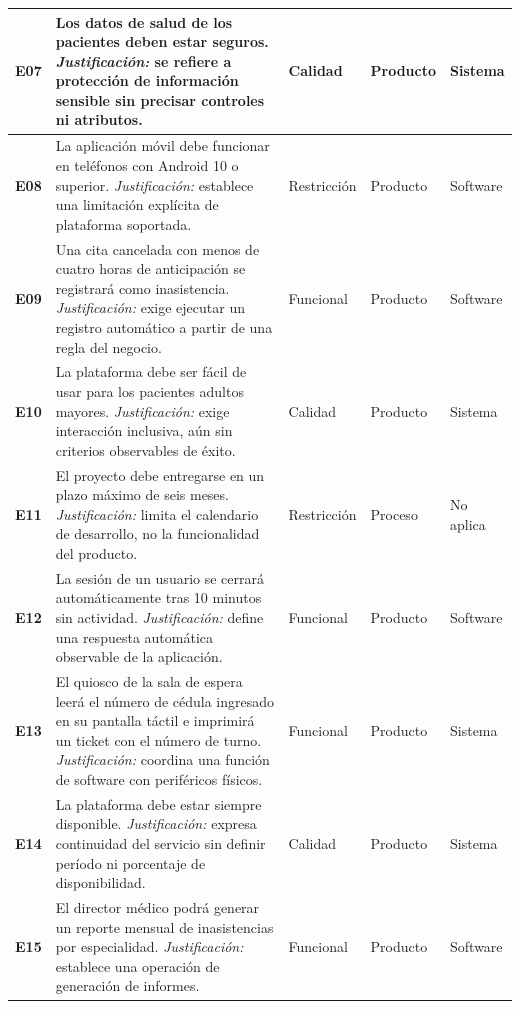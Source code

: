 \documentclass[12pt,a4paper]{article}
\begin{document}
\begin{longtable}{|p{0.72cm}|p{6.85cm}|p{2.00cm}|p{1.65cm}|p{1.75cm}|}
\textbf{E07} &
Los datos de salud de los pacientes deben estar seguros.
\emph{Justificación:} se refiere a protección de información sensible sin precisar controles ni atributos.
& Calidad & Producto & Sistema\\ \hline

\textbf{E08} &
La aplicación móvil debe funcionar en teléfonos con Android 10 o superior.
\emph{Justificación:} establece una limitación explícita de plataforma soportada.
& Restricción & Producto & Software\\ \hline

\textbf{E09} &
Una cita cancelada con menos de cuatro horas de anticipación se registrará como inasistencia.
\emph{Justificación:} exige ejecutar un registro automático a partir de una regla del negocio.
& Funcional & Producto & Software\\ \hline

\textbf{E10} &
La plataforma debe ser fácil de usar para los pacientes adultos mayores.
\emph{Justificación:} exige interacción inclusiva, aún sin criterios observables de éxito.
& Calidad & Producto & Sistema\\ \hline

\textbf{E11} &
El proyecto debe entregarse en un plazo máximo de seis meses.
\emph{Justificación:} limita el calendario de desarrollo, no la funcionalidad del producto.
& Restricción & Proceso & No aplica\\ \hline

\textbf{E12} &
La sesión de un usuario se cerrará automáticamente tras 10 minutos sin actividad.
\emph{Justificación:} define una respuesta automática observable de la aplicación.
& Funcional & Producto & Software\\ \hline

\textbf{E13} &
El quiosco de la sala de espera leerá el número de cédula ingresado en su pantalla táctil e imprimirá un ticket con el número de turno.
\emph{Justificación:} coordina una función de software con periféricos físicos.
& Funcional & Producto & Sistema\\ \hline

\textbf{E14} &
La plataforma debe estar siempre disponible.
\emph{Justificación:} expresa continuidad del servicio sin definir período ni porcentaje de disponibilidad.
& Calidad & Producto & Sistema\\ \hline

\textbf{E15} &
El director médico podrá generar un reporte mensual de inasistencias por especialidad.
\emph{Justificación:} establece una operación de generación de informes.
& Funcional & Producto & Software\\ \hline


\end{longtable}
\end{document}
